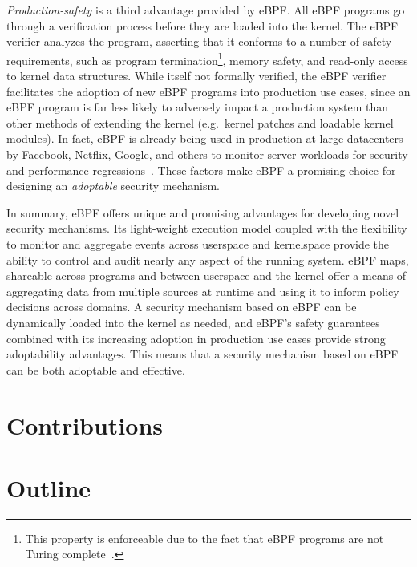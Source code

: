 \textit{Production-safety} is a third advantage provided by eBPF. All eBPF programs go
through a verification process before they are loaded into the kernel. The eBPF verifier
analyzes the program, asserting that it conforms to a number of safety requirements, such
as program termination\footnote{This property is enforceable due to the fact that eBPF
programs are not Turing complete~\cite{gregg2019_bpf}.}, memory safety, and read-only
access to kernel data structures. While itself not formally verified, the eBPF verifier
facilitates the adoption of new eBPF programs into production use cases, since an eBPF
program is far less likely to adversely impact a production system than other methods of
extending the kernel (e.g.~kernel patches and loadable kernel modules). In fact, eBPF is
already being used in production at large datacenters by Facebook, Netflix, Google, and
others to monitor server workloads for security and performance
regressions~\cite{gregg2019_bpf}. These factors make eBPF a promising choice for
designing an \textit{adoptable} security mechanism.

In summary, eBPF offers unique and promising advantages for developing novel security
mechanisms. Its light-weight execution model coupled with the flexibility to monitor and
aggregate events across userspace and kernelspace provide the ability to control and audit
nearly any aspect of the running system. eBPF maps, shareable across programs and between
userspace and the kernel offer a means of aggregating data from multiple sources at
runtime and using it to inform policy decisions across domains. A security mechanism based
on eBPF can be dynamically loaded into the kernel as needed, and eBPF's safety guarantees
combined with its increasing adoption in production use cases provide strong adoptability
advantages. This means that a security mechanism based on eBPF can be both adoptable and
effective.


\section{Contributions}%
\label{s:contributions}


\section{Outline}%
\label{s:outline}

